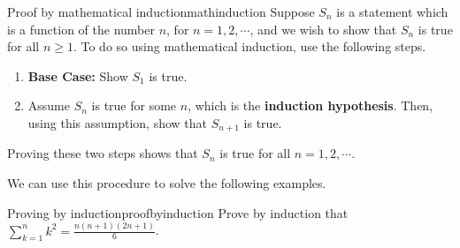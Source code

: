 \begin{procedure}{Proof by mathematical induction}{mathinduction}
Suppose $S_{n}$ is a statement which is a function of the number $n$, for $n=1,2,\cdots$, and
we wish to show that $S_{n}$ is true for all $n \geq 1$. To do so using mathematical induction, use the 
following steps.
\begin{enumerate}
\item \textbf{Base Case:} Show $S_{1}$ is true.

\item Assume $S_{n}$ is true for some $n$, which is the \textbf{induction hypothesis}. Then, using this assumption, 
show that $S_{n+1}$ is true. 
\end{enumerate}

Proving these two steps shows that $S_{n}$ is true for all $n = 1,2,\cdots$.
\end{procedure}

We can use this procedure to solve the following examples.

\begin{example}{Proving by induction}{proofbyinduction}
Prove by induction that $\sum_{k=1}^{n}k^{2}=\displaystyle
\frac{n\left( n+1\right) \left( 2n+1\right) }{6}$.
\end{example}

